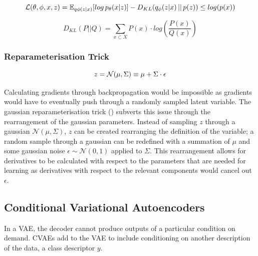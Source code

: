 \documentclass[12pt,twoside]{report}
\begin{document}
\begin{equation}
	\label{eqn:elbo}
	\mathcal{L}(\theta, \phi, x, z) = \mathbb{E}_{q \phi (z|x)}[log \thinspace p_{\theta}(x|z)] - D_{KL}(q_{\phi}(z|x)\thinspace||\thinspace p(z)) \leq log (p(x))
\end{equation}

\begin{equation}
	\label{eqn:kl_divergence}
D_{KL}(P ||Q) = \sum_{x \subset X} P(x) \cdot log (\frac{P(x)}{Q(x)})
\end{equation}


\subsubsection*{Reparameterisation Trick}
\label{reparam_trick}
\begin{equation}
	z = \mathcal{N}(\mu, \Sigma) \equiv \mu + \Sigma \cdot \epsilon \\
	\label{eqn:reparam}
\end{equation}

Calculating gradients through backpropagation would be impossible as gradients would have to eventually push through a randomly sampled latent variable. The gaussian reparameterisation trick (\cite{kingma_auto-encoding_2013}) subverts this issue through the rearrangement of the gaussian parameters. Instead of sampling $z$ through a gaussian $\mathcal{N}(\mu, \Sigma)$, $z$ can be created rearranging the definition of the variable; a random sample through a gaussian can be redefined with a summation of $\mu$ and some gaussian noise $\epsilon \sim \mathcal{N}(0,1)$ applied to $\Sigma$. This rearrangement allows for derivatives to be calculated with respect to the parameters that are needed for learning as derivatives with respect to the relevant components would cancel out $\epsilon$.

\subsection{Conditional Variational Autoencoders}
\label{conditional_variational_autoencoders}
In a VAE, the decoder cannot produce outputs of a particular condition on demand. CVAEs add to the VAE to include conditioning on another description of the data, a class descriptor $y$. 
\end{document}
